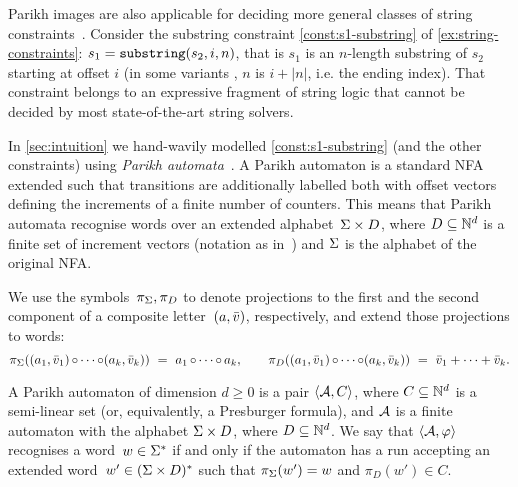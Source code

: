Parikh images are also applicable for deciding more general classes of string
constraints~\cite{ostrich-plus}. Consider the substring constraint
\cref{const:s1-substring} of \cref{ex:string-constraints}: $ s_1 =
\operatorname{\mathtt{substring}}(s_2, i, n)$, that is $s_1$ is an $n$-length substring of $s_2$
starting at offset $i$ (in some variants , $n$ is $i + |n|$, i.e. the ending
index). That constraint belongs to an expressive fragment of string logic that
cannot be decided by most state-of-the-art string solvers.

In \cref{sec:intuition} we hand-wavily modelled \cref{const:s1-substring} (and
  the other constraints) using \emph{Parikh
  automata}~\cite{parikh-automata,expressiveness}. A Parikh automaton is a
  standard NFA extended such that transitions are additionally labelled both
  with offset vectors defining the increments of a finite number of counters.
  This means that Parikh automata recognise words over an extended
  alphabet~$\Sigma \times D$, where $D \subseteq \mathbb{N}^d$ is a finite set
  of increment vectors (notation as in~\cite{expressiveness}) and $\Sigma$ is
  the alphabet of the original NFA.
  
  We use the symbols~$\pi_\Sigma, \pi_D$ to denote projections to the first
  and the second component of a composite letter~$(a, \bar{v})$,
  respectively, and extend those projections to words:
\begin{equation*}
  \pi_\Sigma((a_1, \bar{v}_1) \operatorname{\circ} \cdots \operatorname{\circ} (a_k, \bar{v}_k))
  ~=~ a_1 \operatorname{\circ} \cdots \operatorname{\circ} a_k,
  \qquad
  \pi_D((a_1, \bar{v}_1) \operatorname{\circ} \cdots \operatorname{\circ} (a_k, \bar{v}_k))
  ~=~ \bar{v}_1 + \cdots + \bar{v}_k.
\end{equation*}

\begin{definition}\label{def:parikh-automata} A Parikh automaton of dimension $d
  \geq 0$ is a pair $\left\langle\mathcal{A}, C\right\rangle$, where
  $C \subseteq \mathbb{N}^d$ is a semi-linear set (or, equivalently, a
  Presburger formula), and $\mathcal{A}$ is a finite automaton with the
  alphabet $\Sigma \times D$, where $D \subseteq \mathbb{N}^d$. We
  say that $\left\langle\mathcal{A}, \varphi\right\rangle$ recognises a
  word~$w \in \Sigma^*$ if and only if the automaton has a run
  accepting an extended word~$w' \in (\Sigma \times D)^*$ such that
  $\pi_\Sigma(w') = w$ and $\pi_D(w') \in C$.
\end{definition}

